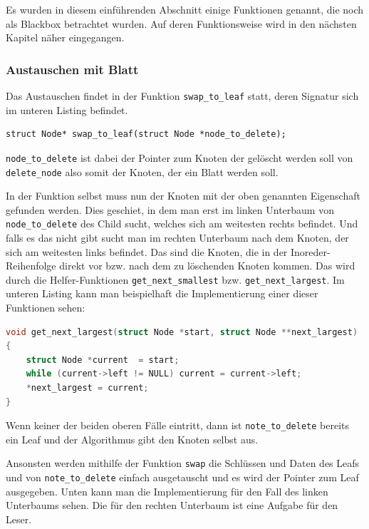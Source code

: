 \documentclass[11pt]{article}
\newcommand{\lstin}[1]{\lstinline[language=C]{#1}}
\begin{document}
Es wurden in diesem einführenden Abschnitt einige Funktionen genannt, die noch als Blackbox
betrachtet wurden. Auf deren Funktionsweise wird in den nächsten Kapitel näher eingegangen.

\subsubsection{Austauschen mit Blatt}

Das Austauschen findet in der Funktion \lstin{swap_to_leaf} statt, deren Signatur sich im unteren Listing befindet.

\begin{lstlisting}
struct Node* swap_to_leaf(struct Node *node_to_delete);
\end{lstlisting}

\lstin{node_to_delete} ist dabei der Pointer zum Knoten der gelöscht werden soll von \lstin{delete_node} also somit der Knoten, der ein Blatt werden soll.

In der Funktion selbst muss nun der Knoten mit der oben genannten Eigenschaft gefunden werden. Dies geschiet, in dem man erst im linken Unterbaum von \lstin{node_to_delete} des Child sucht, welches sich am weitesten rechts befindet.
Und falls es das nicht gibt sucht man im rechten Unterbaum nach dem Knoten, der sich am weitesten links befindet. Das sind die Knoten, die in der Inoreder-Reihenfolge direkt vor bzw. nach dem zu löschenden Knoten kommen.
Das wird durch die Helfer-Funktionen \lstin{get_next_smallest} bzw. \lstin{get_next_largest}. Im unteren Listing kann man beispielhaft die Implementierung einer dieser Funktionen sehen:

\begin{lstlisting}[language=C]
void get_next_largest(struct Node *start, struct Node **next_largest)
{
    struct Node *current  = start;
    while (current->left != NULL) current = current->left;
    *next_largest = current;
}
\end{lstlisting}

Wenn keiner der beiden oberen Fälle eintritt, dann ist \lstin{note_to_delete} bereits ein Leaf und der Algorithmus gibt den Knoten selbst aus.

Ansonsten werden mithilfe der Funktion \lstin{swap} die Schlüssen und Daten des Leafs und von \lstin{note_to_delete} einfach ausgetauscht und es wird der Pointer zum Leaf ausgegeben.
Unten kann man die Implementierung für den Fall des linken Unterbaums sehen. 
Die für den rechten Unterbaum ist eine Aufgabe für den Leser.
\end{document}
